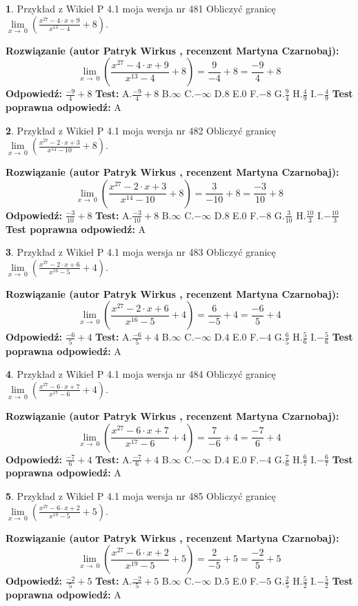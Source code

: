 \documentclass[12pt, a4paper]{article}
\theoremstyle{definition} %
\newtheorem{zad}{}
\newcommand{\zadStart}[1]{\begin{zad}#1\newline}
\newcommand{\zadStop}{\end{zad}}
\newcommand{\rozwStart}[2]{\noindent \textbf{Rozwiązanie (autor #1 , recenzent #2): }\newline}
\newcommand{\rozwStop}{\newline}
\newcommand{\odpStart}{\noindent \textbf{Odpowiedź:}\newline}
\newcommand{\odpStop}{\newline}
\newcommand{\testStart}{\noindent \textbf{Test:}\newline}
\newcommand{\testStop}{\newline}
\newcommand{\kluczStart}{\noindent \textbf{Test poprawna odpowiedź:}\newline}
\newcommand{\kluczStop}{\newline}
\begin{document}
\zadStart{Przykład z Wikieł P 4.1 moja wersja nr 481}
Obliczyć granicę $\lim\limits_{x\to\ 0}(\frac{x^{27}-4 \cdot x +9}{x^{13}-4}+8)$.
\zadStop
\rozwStart{Patryk Wirkus}{Martyna Czarnobaj}
$$\lim\limits_{x\to\ 0}(\frac{x^{27}-4 \cdot x +9}{x^{13}-4}+8)=\frac{9}{-4}+8=\frac{-9}{4}+8$$
\rozwStop
\odpStart
$\frac{-9}{4}+8$
\odpStop
\testStart
A.$\frac{-9}{4}+8$
B.$\infty$
C.$-\infty$
D.$8$
E.$0$
F.$-8$
G.$\frac{9}{4}$
H.$\frac{4}{9}$
I.$-\frac{4}{9}$
\testStop
\kluczStart
A
\kluczStop



\zadStart{Przykład z Wikieł P 4.1 moja wersja nr 482}
Obliczyć granicę $\lim\limits_{x\to\ 0}(\frac{x^{27}-2 \cdot x +3}{x^{14}-10}+8)$.
\zadStop
\rozwStart{Patryk Wirkus}{Martyna Czarnobaj}
$$\lim\limits_{x\to\ 0}(\frac{x^{27}-2 \cdot x +3}{x^{14}-10}+8)=\frac{3}{-10}+8=\frac{-3}{10}+8$$
\rozwStop
\odpStart
$\frac{-3}{10}+8$
\odpStop
\testStart
A.$\frac{-3}{10}+8$
B.$\infty$
C.$-\infty$
D.$8$
E.$0$
F.$-8$
G.$\frac{3}{10}$
H.$\frac{10}{3}$
I.$-\frac{10}{3}$
\testStop
\kluczStart
A
\kluczStop



\zadStart{Przykład z Wikieł P 4.1 moja wersja nr 483}
Obliczyć granicę $\lim\limits_{x\to\ 0}(\frac{x^{27}-2 \cdot x +6}{x^{16}-5}+4)$.
\zadStop
\rozwStart{Patryk Wirkus}{Martyna Czarnobaj}
$$\lim\limits_{x\to\ 0}(\frac{x^{27}-2 \cdot x +6}{x^{16}-5}+4)=\frac{6}{-5}+4=\frac{-6}{5}+4$$
\rozwStop
\odpStart
$\frac{-6}{5}+4$
\odpStop
\testStart
A.$\frac{-6}{5}+4$
B.$\infty$
C.$-\infty$
D.$4$
E.$0$
F.$-4$
G.$\frac{6}{5}$
H.$\frac{5}{6}$
I.$-\frac{5}{6}$
\testStop
\kluczStart
A
\kluczStop



\zadStart{Przykład z Wikieł P 4.1 moja wersja nr 484}
Obliczyć granicę $\lim\limits_{x\to\ 0}(\frac{x^{27}-6 \cdot x +7}{x^{17}-6}+4)$.
\zadStop
\rozwStart{Patryk Wirkus}{Martyna Czarnobaj}
$$\lim\limits_{x\to\ 0}(\frac{x^{27}-6 \cdot x +7}{x^{17}-6}+4)=\frac{7}{-6}+4=\frac{-7}{6}+4$$
\rozwStop
\odpStart
$\frac{-7}{6}+4$
\odpStop
\testStart
A.$\frac{-7}{6}+4$
B.$\infty$
C.$-\infty$
D.$4$
E.$0$
F.$-4$
G.$\frac{7}{6}$
H.$\frac{6}{7}$
I.$-\frac{6}{7}$
\testStop
\kluczStart
A
\kluczStop



\zadStart{Przykład z Wikieł P 4.1 moja wersja nr 485}
Obliczyć granicę $\lim\limits_{x\to\ 0}(\frac{x^{27}-6 \cdot x +2}{x^{19}-5}+5)$.
\zadStop
\rozwStart{Patryk Wirkus}{Martyna Czarnobaj}
$$\lim\limits_{x\to\ 0}(\frac{x^{27}-6 \cdot x +2}{x^{19}-5}+5)=\frac{2}{-5}+5=\frac{-2}{5}+5$$
\rozwStop
\odpStart
$\frac{-2}{5}+5$
\odpStop
\testStart
A.$\frac{-2}{5}+5$
B.$\infty$
C.$-\infty$
D.$5$
E.$0$
F.$-5$
G.$\frac{2}{5}$
H.$\frac{5}{2}$
I.$-\frac{5}{2}$
\testStop
\kluczStart
A
\kluczStop
\end{document}
